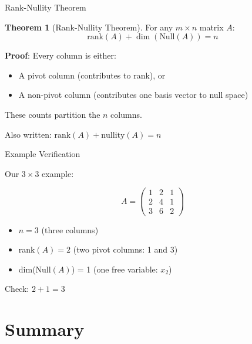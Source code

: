 \documentclass[10pt]{beamer}
\theoremstyle{definition}
\newtheorem{thm}{Theorem}[section]
\newcommand{\x}[1]{\alert{\textbf{#1}}}
\begin{document}
\begin{frame}{Rank-Nullity Theorem}

\begin{thm}[Rank-Nullity Theorem]
For any $m \times n$ matrix $A$:
$$\boxed{\text{rank}(A) + \dim(\text{Null}(A)) = n}$$
\end{thm}

\vspace{1em}

\x{Proof}: Every column is either:
\begin{itemize}
\item A pivot column (contributes to rank), or
\item A non-pivot column (contributes one basis vector to null space)
\end{itemize}

These counts partition the $n$ columns.

\vspace{1em}

Also written: $\text{rank}(A) + \text{nullity}(A) = n$

\end{frame}

\begin{frame}{Example Verification}

Our $3 \times 3$ example:

$$A = \begin{pmatrix} 1&2&1 \\ 2&4&1 \\ 3&6&2 \end{pmatrix}$$

\vspace{1em}

\begin{itemize}
\item $n = 3$ (three columns)
\item rank$(A) = 2$ (two pivot columns: 1 and 3)
\item dim(Null$(A)$) = 1 (one free variable: $x_2$)
\end{itemize}

\vspace{1em}

Check: $2 + 1 = 3$ \checkmark

\end{frame}

\section{Summary}
\end{document}
